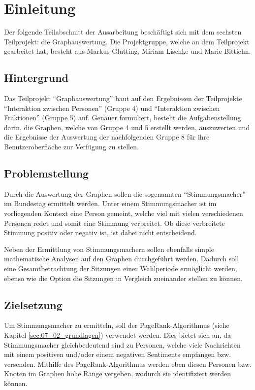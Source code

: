 \section{Einleitung}\label{sec:07_01_einleitung}

Der folgende Teilabschnitt der Ausarbeitung beschäftigt sich mit dem sechsten Teilprojekt: die Graphauswertung. Die Projektgruppe, welche an dem Teilprojekt gearbeitet hat, besteht aus Markus Glutting, Miriam Lischke und Marie Bittiehn.

\subsection{Hintergrund}
Das Teilprojekt ``Graphauswertung'' baut auf den Ergebnissen der Teilprojekte ``Interaktion zwischen Personen'' (Gruppe 4) und ``Interaktion zwischen Fraktionen'' (Gruppe 5) auf. Genauer formuliert, besteht die Aufgabenstellung darin, die Graphen, welche von Gruppe 4 und 5 erstellt werden, auszuwerten und die Ergebnisse der Auswertung der nachfolgenden Gruppe 8 für ihre Benutzeroberfläche zur Verfügung zu stellen.

\subsection{Problemstellung}
Durch die Auswertung der Graphen sollen die sogenannten ``Stimmungsmacher'' im Bundestag ermittelt werden. Unter einem Stimmungsmacher ist im vorliegenden Kontext eine Person gemeint, welche viel mit vielen verschiedenen Personen redet und somit eine Stimmung verbreitet. Ob diese verbreitete Stimmung positiv oder negativ ist, ist dabei nicht entscheidend.

Neben der Ermittlung von Stimmungsmachern sollen ebenfalls simple mathematische Analysen auf den Graphen durchgeführt werden. Dadurch soll eine Gesamtbetrachtung der Sitzungen einer Wahlperiode ermöglicht werden, ebenso wie die Option die Sitzungen in Vergleich zueinander stellen zu können.

\subsection{Zielsetzung}
Um Stimmungsmacher zu ermitteln, soll der PageRank-Algorithmus (siehe Kapitel \ref{sec:07_02_grundlagen}) verwendet werden. Dies bietet sich an, da Stimmungsmacher gleichbedeutend sind zu Personen, welche viele Nachrichten mit einem positiven und/oder einem negativen Sentiments empfangen bzw. versenden. Mithilfe des PageRank-Algorithmus werden eben diesen Personen bzw. Knoten im Graphen hohe Ränge vergeben, wodurch sie identifiziert werden können.

